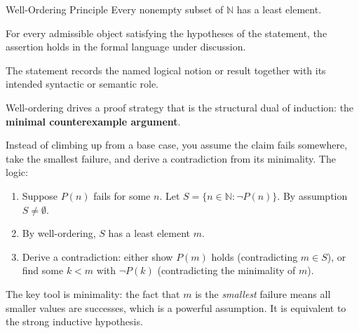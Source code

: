\noindent\begin{propositionbox}{Well-Ordering Principle}
Every nonempty subset of $\mathbb{N}$ has a least element.
\end{propositionbox}
\begin{remark*}
For every admissible object satisfying the hypotheses of the statement, the
assertion holds in the formal language under discussion.
\end{remark*}

\begin{remark*}[Interpretation]
The statement records the named logical notion or result together with its
intended syntactic or semantic role.
\end{remark*}

\label{sec:wellordering}

\begin{remark}
Well-ordering drives a proof strategy that is the structural dual of
induction: the \textbf{minimal counterexample argument}.

Instead of climbing up from a base case, you assume the claim fails
somewhere, take the smallest failure, and derive a contradiction from
its minimality. The logic:

\begin{enumerate}[itemsep=2pt]
  \item Suppose $P(n)$ fails for some $n$. Let
    $S = \{n \in \mathbb{N} : \neg P(n)\}$. By assumption $S \neq \emptyset$.
  \item By well-ordering, $S$ has a least element $m$.
  \item Derive a contradiction: either show $P(m)$ holds (contradicting
    $m \in S$), or find some $k < m$ with $\neg P(k)$ (contradicting
    the minimality of $m$).
\end{enumerate}

The key tool is minimality: the fact that $m$ is the \emph{smallest}
failure means all smaller values are successes, which is a powerful
assumption. It is equivalent to the strong inductive hypothesis.
\end{remark}

